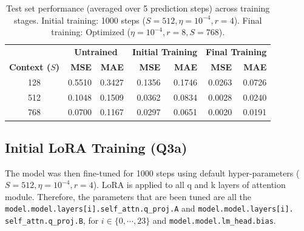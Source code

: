 \documentclass{article}
\begin{document}
\begin{table}[!htbp] %
\renewcommand{\arraystretch}{1.4} \centering \setlength{\tabcolsep}{8pt}
\begin{tabular}{@{}c rr rr rr@{}} %
    \toprule
    & \multicolumn{2}{c}{\textbf{Untrained}}
    & \multicolumn{2}{c}{\textbf{Initial Training}}
    & \multicolumn{2}{c}{\textbf{Final Training}} \\
    \cmidrule(lr){2-3} \cmidrule(lr){4-5} \cmidrule(lr){6-7}
    \textbf{Context ($S$)} & \textbf{MSE} & \textbf{MAE} & \textbf{MSE} & \textbf{MAE} & \textbf{MSE} & \textbf{MAE} \\ \midrule
    128 & 0.5510 & 0.3427 & 0.1356 & 0.1746 & 0.0263 & 0.0726 \\ %
    512 & 0.1048 & 0.1509 & 0.0362 & 0.0834 & 0.0028 & 0.0240 \\
    768 & 0.0700 & 0.1167 & 0.0297 & 0.0651 & 0.0020 & 0.0191 \\
    \bottomrule
\end{tabular}
\caption{Test set performance (averaged over 5 prediction steps) across training stages. Initial training: 1000 steps ($S=512, \eta=10^{-4}, r=4$). Final training: Optimized ($\eta=10^{-4}, r=8, S=768$).} %
\label{tab:training_stage_comparison}
\end{table}


\subsection{Initial LoRA Training (Q3a)}
\label{sec:initial}

The model was then fine-tuned for 1000 steps using default hyper-parameters ($S=512, \eta=10^{-4}, r=4$). LoRA is applied to all q and k layers of attention module. Therefore, the parameters that are been tuned are all the \texttt{model.model.layers[i].self\_attn.q\_proj.A} and \texttt{model.model.layers[i]. self\_attn.q\_proj.B}, for $i \in \{0, \cdots, 23\}$ and \texttt{model.model.lm\_head.bias}.
\end{document}
